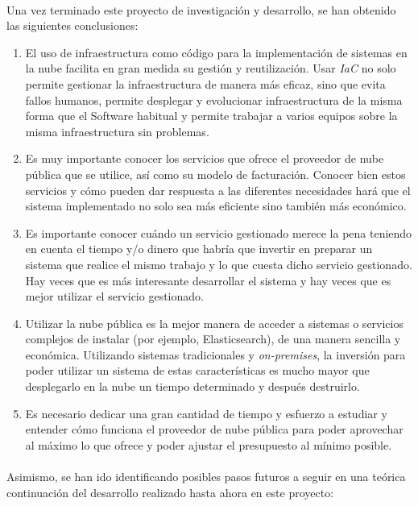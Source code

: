 \documentclass[../../memoria.tex]{subfiles}
\begin{document}
\paragraph{}
Una vez terminado este proyecto de investigación y desarrollo, se han obtenido las siguientes conclusiones:
\begin{enumerate}
    \item El uso de infraestructura como código para la implementación de sistemas en la nube facilita en gran medida su gestión y reutilización. Usar \textit{IaC} no solo permite gestionar la infraestructura de manera más eficaz, sino que evita fallos humanos, permite desplegar y evolucionar infraestructura de la misma forma que el Software habitual y permite trabajar a varios equipos sobre la misma infraestructura sin problemas.

    \item Es muy importante conocer los servicios que ofrece el proveedor de nube pública que se utilice, así como su modelo de facturación. Conocer bien estos servicios y cómo pueden dar respuesta a las diferentes necesidades hará que el sistema implementado no solo sea más eficiente sino también más económico.

    \item Es importante conocer cuándo un servicio gestionado merece la pena teniendo en cuenta el tiempo y/o dinero que habría que invertir en preparar un sistema que realice el mismo trabajo y lo que cuesta dicho servicio gestionado. Hay veces que es más interesante desarrollar el sistema y hay veces que es mejor utilizar el servicio gestionado.

    \item Utilizar la nube pública es la mejor manera de acceder a sistemas o servicios complejos de instalar (por ejemplo, Elasticsearch), de una manera sencilla y económica. Utilizando sistemas tradicionales y \textit{on-premises}, la inversión para poder utilizar un sistema de estas características es mucho mayor que desplegarlo en la nube un tiempo determinado y después destruirlo.

    \item Es necesario dedicar una gran cantidad de tiempo y esfuerzo a estudiar y entender cómo funciona el proveedor de nube pública para poder aprovechar al máximo lo que ofrece y poder ajustar el presupuesto al mínimo posible.

\end{enumerate}

\paragraph{}
Asimismo, se han ido identificando posibles pasos futuros a seguir en una teórica continuación del desarrollo realizado hasta ahora en este proyecto:
\end{document}
